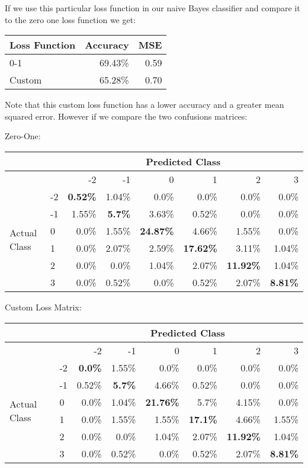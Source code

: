If we use this particular loss function in our naive Bayes classifier and compare it to the zero one loss function we get:
\begin{center}
	\begin{tabular}{l r r}
		\hline
		Loss Function & Accuracy & MSE  \\
		\hline
		0-1           & 69.43\%  & 0.59 \\
		Custom        & 65.28\%  & 0.70 \\
		\hline
	\end{tabular}
\end{center}

Note that this custom loss function has a lower accuracy and a greater mean squared error.
However if we compare the two confusions matrices:

Zero-One:
\begin{center}
\begin{tabular}{l l r r r r r r}
    \hline
                       &    & \multicolumn{6}{c}{Predicted Class}                   \\
    \hline
                       &    & -2      & -1    & 0       & 1       & 2       & 3     \\
    \hline
\multirow{6}{*}{Actual Class} & -2 & \bf{0.52\%} & 1.04\% & 0.0\% & 0.0\% & 0.0\% & 0.0\% \\
& -1 & 1.55\% & \bf{5.7\%} & 3.63\% & 0.52\% & 0.0\% & 0.0\% \\
& 0 & 0.0\% & 1.55\% & \bf{24.87\%} & 4.66\% & 1.55\% & 0.0\% \\
& 1 & 0.0\% & 2.07\% & 2.59\% & \bf{17.62\%} & 3.11\% & 1.04\% \\
& 2 & 0.0\% & 0.0\% & 1.04\% & 2.07\% & \bf{11.92\%} & 1.04\% \\
& 3 & 0.0\% & 0.52\% & 0.0\% & 0.52\% & 2.07\% & \bf{8.81\%} \\
\hline
\end{tabular}
\end{center}

Custom Loss Matrix:
\begin{center}
\begin{tabular}{l l r r r r r r}
    \hline
                       &    & \multicolumn{6}{c}{Predicted Class}                   \\
    \hline
                       &    & -2      & -1    & 0       & 1       & 2       & 3     \\
    \hline
\multirow{6}{*}{Actual Class} & -2 & \bf{0.0\%} & 1.55\% & 0.0\% & 0.0\% & 0.0\% & 0.0\% \\
& -1 & 0.52\% & \bf{5.7\%} & 4.66\% & 0.52\% & 0.0\% & 0.0\% \\
& 0 & 0.0\% & 1.04\% & \bf{2}\bf{1.76\%} & 5.7\% & 4.15\% & 0.0\% \\
& 1 & 0.0\% & 1.55\% & 1.55\% & \bf{17.1\%} & 4.66\% & 1.55\% \\
& 2 & 0.0\% & 0.0\% & 1.04\% & 2.07\% & \bf{11.92\%} & 1.04\% \\
& 3 & 0.0\% & 0.52\% & 0.0\% & 0.52\% & 2.07\% & \bf{8.81\%}\\
\hline
\end{tabular}
\end{center}

